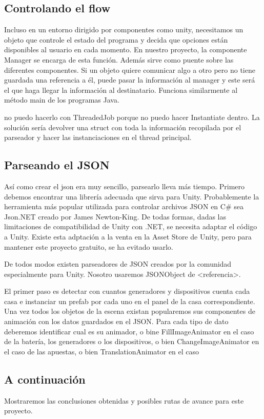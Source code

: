 \documentclass[12pt,a4paper,openright,oneside]{article}
\numberwithin{equation}{section}
\theoremstyle{definition}
\begin{document}
\subsection{Controlando el flow}
Incluso en un entorno dirigido por componentes como unity, necesitamos un objeto que controle el estado del programa y decida que opciones están disponibles al usuario en cada momento. En nuestro proyecto, la componente Manager se encarga de esta función. Además sirve como puente sobre las diferentes componentes. Si un objeto quiere comunicar algo a otro pero no tiene guardada una referencia a él, puede pasar la información al manager y este será el que haga llegar la información al destinatario. Funciona similarmente al método main de los programas Java.

no puedo hacerlo con ThreadedJob porque no puedo hacer Instantiate dentro. La solución sería devolver una struct con toda la información recopilada por el parseador y hacer las instanciaciones en el thread principal. \subsection{Parseando el JSON}

Así como crear el json era muy sencillo, parsearlo lleva más tiempo. Primero debemos encontrar una librería adecuada que sirva para Unity. Probablemente la herramienta más popular utilizada para controlar archivos JSON en C\# sea Json.NET creado por James Newton-King. De todas formas, dadas las limitaciones de compatibilidad de Unity con .NET, se necesita adaptar el código a Unity. Existe esta adptación a la venta en la Asset Store de Unity, pero para mantener este proyecto gratuito, se ha evitado usarlo. 

De todos modos existen parseadores de JSON creados por la comunidad especialmente para Unity. Nosotro usaremos JSONObject de <referencia>.

El primer paso es detectar con cuantos generadores y dispositivos cuenta cada casa e instanciar un prefab por cada uno en el panel de la casa correspondiente. Una vez todos los objetos de la escena existan popularemos sus componentes de animación con los datos guardados en el JSON. Para cada tipo de dato deberemos identificar cual es su animador, o bine FillImageAnimator en el caso de la batería, los generadores o los dispositivos, o bien ChangeImageAnimator en el caso de las apuestas, o bien TranslationAnimator en el caso 

\subsection{A continuación}
Mostraremos las conclusiones obtenidas y posibles rutas de avance para este proyecto.
\end{document}
